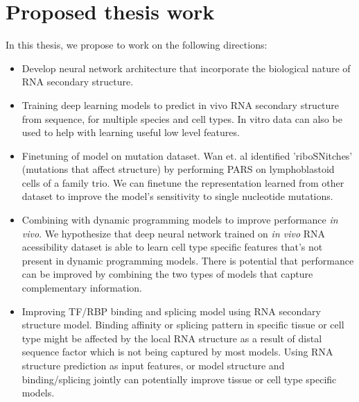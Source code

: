\documentclass{proposal}
\begin{document}
\section{Proposed thesis work}

In this thesis, we propose to work on the following directions:

\begin{itemize}
    \item Develop neural network architecture that incorporate the biological nature of RNA secondary structure.

    \item Training deep learning models to predict in vivo RNA secondary structure from sequence, for multiple species and cell types.
        In vitro data can also be used to help with learning useful low level features.

    \item Finetuning of model on mutation dataset.
        Wan et. al\cite{wan2014landscape} identified '﻿riboSNitches' (mutations that affect structure)
        by performing PARS on ﻿lymphoblastoid cells of a family trio.
        We can finetune the representation learned from other dataset to improve the model's sensitivity to single nucleotide mutations.

    \item Combining with dynamic programming models to improve performance \textit{in vivo}.
        We hypothesize that deep neural network trained on \textit{in vivo} RNA acessibility dataset is able to
        learn cell type specific features that's not present in dynamic programming models.
        There is potential that performance can be improved by combining the two types of models that capture complementary information.

%

    \item Improving TF/RBP binding and splicing model using RNA secondary structure model.
        Binding affinity or splicing pattern in specific tissue or cell type might be affected
        by the local RNA structure as a result of distal sequence factor which is not being captured by most models.
        Using RNA structure prediction as input features, or model structure and binding/splicing jointly can potentially improve tissue or cell type specific models.
\end{itemize}
\end{document}

